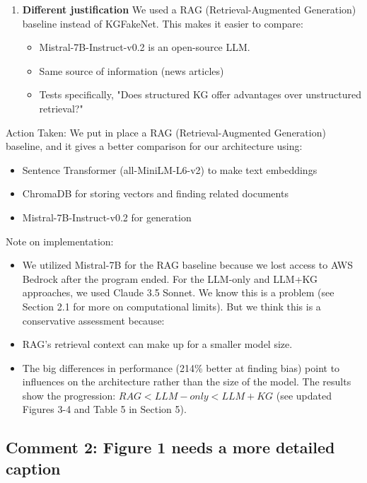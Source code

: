 \documentclass[11pt]{article}
\begin{document}
\begin{enumerate}
\begin{itemize}
        \end{itemize}
\item \textbf{Different justification}
We used a RAG (Retrieval-Augmented Generation) baseline instead of KGFakeNet. This makes it easier to compare:

\begin{itemize}
    \item Mistral-7B-Instruct-v0.2 is an open-source LLM.
\item Same source of information (news articles)
\item Tests specifically, "Does structured KG offer advantages over unstructured retrieval?"

\end{itemize}
\end{enumerate}
Action Taken: 
We put in place a RAG (Retrieval-Augmented Generation) baseline, and it gives a better comparison for our architecture using:
\begin{itemize}
    \item Sentence Transformer (all-MiniLM-L6-v2) to make text embeddings
    \item ChromaDB for storing vectors and finding related documents
    \item Mistral-7B-Instruct-v0.2 for generation
\end{itemize}

Note on implementation:

\begin{itemize}
    \item We utilized Mistral-7B for the RAG baseline because we lost access to AWS Bedrock after the program ended. 
For the LLM-only and LLM+KG approaches, we used Claude 3.5 Sonnet. We know this is a problem (see Section 2.1 for more on computational limits). But we think this is a conservative assessment because:
\item RAG's retrieval context can make up for a smaller model size.
\item The big differences in performance (214\% better at finding bias) point to influences on the architecture rather than the size of the model. The results show the progression: $RAG < LLM-only < LLM+KG$ (see updated Figures 3-4 and Table 5 in Section 5).

\end{itemize}


\subsection{Comment 2: Figure 1 needs a more detailed caption}
\end{document}

